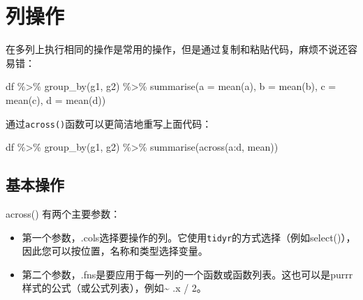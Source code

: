 \documentclass[
]{book}
\newenvironment{Shaded}{\begin{snugshade}}{\end{snugshade}}
\newcommand{\AttributeTok}[1]{\textcolor[rgb]{0.77,0.63,0.00}{#1}}
\newcommand{\FunctionTok}[1]{\textcolor[rgb]{0.00,0.00,0.00}{#1}}
\newcommand{\NormalTok}[1]{#1}
\newcommand{\SpecialCharTok}[1]{\textcolor[rgb]{0.00,0.00,0.00}{#1}}
\begin{document}
\hypertarget{ux5217ux64cdux4f5c}{%
\section{列操作}\label{ux5217ux64cdux4f5c}}

在多列上执行相同的操作是常用的操作，但是通过复制和粘贴代码，麻烦不说还容易错：

\begin{Shaded}
\begin{Highlighting}[]
\NormalTok{df }\SpecialCharTok{\%\textgreater{}\%} 
  \FunctionTok{group\_by}\NormalTok{(g1, g2) }\SpecialCharTok{\%\textgreater{}\%} 
  \FunctionTok{summarise}\NormalTok{(}\AttributeTok{a =} \FunctionTok{mean}\NormalTok{(a), }\AttributeTok{b =} \FunctionTok{mean}\NormalTok{(b), }\AttributeTok{c =} \FunctionTok{mean}\NormalTok{(c), }\AttributeTok{d =} \FunctionTok{mean}\NormalTok{(d))}
\end{Highlighting}
\end{Shaded}

通过\texttt{across()}函数可以更简洁地重写上面代码：

\begin{Shaded}
\begin{Highlighting}[]
\NormalTok{df }\SpecialCharTok{\%\textgreater{}\%} 
  \FunctionTok{group\_by}\NormalTok{(g1, g2) }\SpecialCharTok{\%\textgreater{}\%} 
  \FunctionTok{summarise}\NormalTok{(}\FunctionTok{across}\NormalTok{(a}\SpecialCharTok{:}\NormalTok{d, mean))}
\end{Highlighting}
\end{Shaded}

\hypertarget{ux57faux672cux64cdux4f5c}{%
\subsection{基本操作}\label{ux57faux672cux64cdux4f5c}}

across() 有两个主要参数：

\begin{itemize}
\item
  第一个参数，.cols选择要操作的列。它使用\texttt{tidyr}的方式选择（例如select()），因此您可以按位置，名称和类型选择变量。
\item
  第二个参数，.fns是要应用于每一列的一个函数或函数列表。这也可以是purrr样式的公式（或公式列表），例如\textasciitilde{} .x / 2。
\end{itemize}
\end{document}
